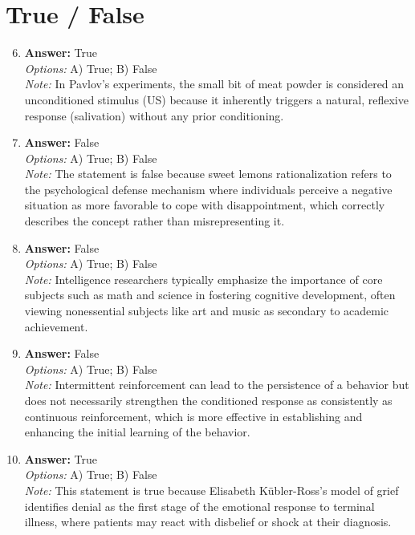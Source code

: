 \documentclass[12pt]{article}
\begin{document}
\section*{True / False}
\begin{enumerate}[label=\arabic*.]
\setcounter{enumi}{5}
\item \textbf{Answer:} True
\\ \textit{Options:} A) True; B) False
\\ \textit{Note:} In Pavlov's experiments, the small bit of meat powder is considered an unconditioned stimulus (US) because it inherently triggers a natural, reflexive response (salivation) without any prior conditioning.
\item \textbf{Answer:} False
\\ \textit{Options:} A) True; B) False
\\ \textit{Note:} The statement is false because sweet lemons rationalization refers to the psychological defense mechanism where individuals perceive a negative situation as more favorable to cope with disappointment, which correctly describes the concept rather than misrepresenting it.
\item \textbf{Answer:} False
\\ \textit{Options:} A) True; B) False
\\ \textit{Note:} Intelligence researchers typically emphasize the importance of core subjects such as math and science in fostering cognitive development, often viewing nonessential subjects like art and music as secondary to academic achievement.
\item \textbf{Answer:} False
\\ \textit{Options:} A) True; B) False
\\ \textit{Note:} Intermittent reinforcement can lead to the persistence of a behavior but does not necessarily strengthen the conditioned response as consistently as continuous reinforcement, which is more effective in establishing and enhancing the initial learning of the behavior.
\item \textbf{Answer:} True
\\ \textit{Options:} A) True; B) False
\\ \textit{Note:} This statement is true because Elisabeth Kübler-Ross's model of grief identifies denial as the first stage of the emotional response to terminal illness, where patients may react with disbelief or shock at their diagnosis.
\end{enumerate}
\end{document}
